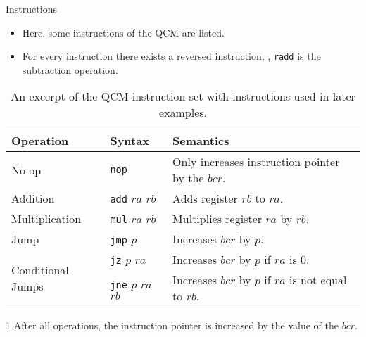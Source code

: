 \begin{frame}{Instructions}
    \begin{itemize}
        \item Here, some instructions of the QCM are listed.
        \item For every instruction there exists a reversed instruction, \eg, \texttt{radd} is the subtraction operation.
    \end{itemize}
    \begin{table}[htp]
        \centering
        \begin{threeparttable}[b]
            \begin{tabular}{llp{}}
                \multicolumn{1}{l|}{Operation}                          & \multicolumn{1}{l|}{Syntax}                                      & Semantics\tnote{1}                                                              \\ \hline
                
                \multicolumn{1}{l|}{No-op}                              & \multicolumn{1}{l|}{\texttt{nop}}               & Only increases instruction pointer by the $bcr$.     \\ \hline
                
                \multicolumn{1}{l|}{Addition}                           & \multicolumn{1}{l|}{\texttt{add} $ra$ $rb$}     & Adds register $rb$ to $ra$.                                            \\
                \multicolumn{1}{l|}{Multiplication}                     & \multicolumn{1}{l|}{\texttt{mul} $ra$ $rb$}     & Multiplies register $ra$ by $rb$.                                      \\ \hline
                
                \multicolumn{1}{l|}{Jump}                               & \multicolumn{1}{l|}{\texttt{jmp} $p$}           & Increases $bcr$ by $p$.                              \\
                \multicolumn{1}{l|}{\multirow{2}{*}{Conditional Jumps}} & \multicolumn{1}{l|}{\texttt{jz} $p$ $ra$}       & Increases $bcr$ by $p$ if $ra$ is $0$.               \\
                \multicolumn{1}{l|}{}                                   & \multicolumn{1}{l|}{\texttt{jne} $p$ $ra$ $rb$} & Increases $bcr$ by $p$ if $ra$ is not equal to $rb$. 
            \end{tabular}
            \begin{tablenotes}
                \item [1] After all operations, the instruction pointer is increased by the value of the $bcr$.
            \end{tablenotes}
        \end{threeparttable}
        \caption{An excerpt of the QCM instruction set with instructions used in later examples.}
        \label{tab:qcm_instructionset}
    \end{table}
\end{frame}

